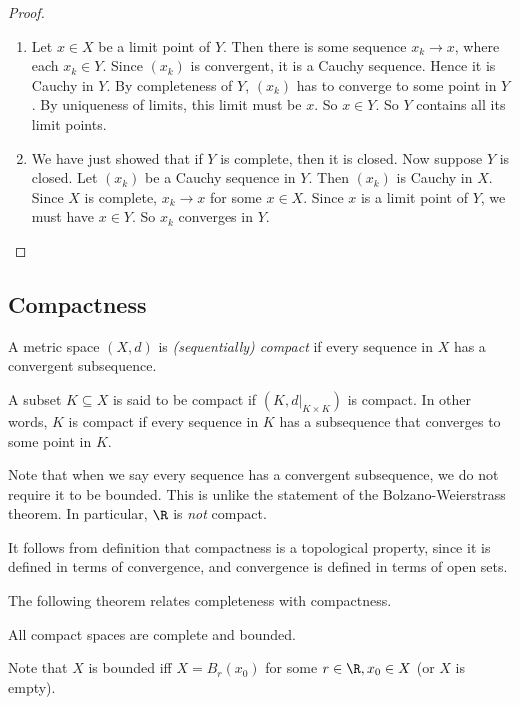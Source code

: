 \documentclass[a4paper]{article}
\begin{document}
\begin{proof}\leavevmode
  \begin{enumerate}
    \item Let $x \in X$ be a limit point of $Y$. Then there is some sequence $x_k \to x$, where each $x_k \in Y$. Since $(x_k)$ is convergent, it is a Cauchy sequence. Hence it is Cauchy in $Y$. By completeness of $Y$, $(x_k)$ has to converge to some point in $Y$. By uniqueness of limits, this limit must be $x$. So $x \in Y$. So $Y$ contains all its limit points.
    \item We have just showed that if $Y$ is complete, then it is closed. Now suppose $Y$ is closed. Let $(x_k)$ be a Cauchy sequence in $Y$. Then $(x_k)$ is Cauchy in $X$. Since $X$ is complete, $x_k\to x$ for some $x \in X$. Since $x$ is a limit point of $Y$, we must have $x \in Y$. So $x_k$ converges in $Y$.
  \end{enumerate}
\end{proof}

\subsection{Compactness}
\begin{defi}
  A metric space $(X, d)$ is \emph{(sequentially) compact} if every sequence in $X$ has a convergent subsequence.

  A subset $K\subseteq X$ is said to be compact if $(K, d|_{K\times K})$ is compact. In other words, $K$ is compact if every sequence in $K$ has a subsequence that converges to some point in $K$.
\end{defi}
Note that when we say every sequence has a convergent subsequence, we do not require it to be bounded. This is unlike the statement of the Bolzano-Weierstrass theorem. In particular, $\R$ is \emph{not} compact.

It follows from definition that compactness is a topological property, since it is defined in terms of convergence, and convergence is defined in terms of open sets.

The following theorem relates completeness with compactness.
\begin{thm}
  All compact spaces are complete and bounded.
\end{thm}
Note that $X$ is bounded iff $X = B_r(x_0)$ for some $r \in \R, x_0 \in X$ (or $X$ is empty).
\end{document}
